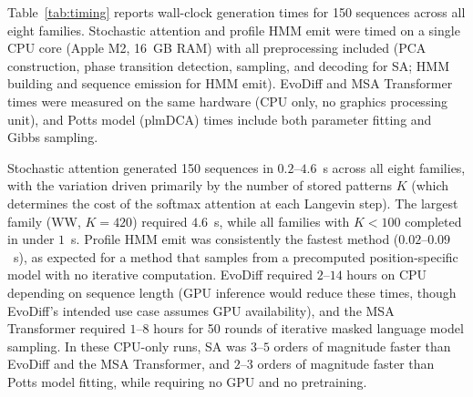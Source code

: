 Table~\ref{tab:timing} reports wall-clock generation times for 150 sequences across all eight families. Stochastic attention and profile HMM emit were timed on a single CPU core (Apple M2, 16~GB RAM) with all preprocessing included (PCA construction, phase transition detection, sampling, and decoding for SA; HMM building and sequence emission for HMM emit). EvoDiff and MSA Transformer times were measured on the same hardware (CPU only, no graphics processing unit), and Potts model (plmDCA) times include both parameter fitting and Gibbs sampling.

Stochastic attention generated 150 sequences in $0.2$--$4.6$~s across all eight families, with the variation driven primarily by the number of stored patterns $K$ (which determines the cost of the softmax attention at each Langevin step). The largest family (WW, $K{=}420$) required $4.6$~s, while all families with $K < 100$ completed in under $1$~s. Profile HMM emit was consistently the fastest method ($0.02$--$0.09$~s), as expected for a method that samples from a precomputed position-specific model with no iterative computation. EvoDiff required $2$--$14$ hours on CPU depending on sequence length (GPU inference would reduce these times, though EvoDiff's intended use case assumes GPU availability), and the MSA Transformer required $1$--$8$ hours for 50 rounds of iterative masked language model sampling. In these CPU-only runs, SA was $3$--$5$ orders of magnitude faster than EvoDiff and the MSA Transformer, and $2$--$3$ orders of magnitude faster than Potts model fitting, while requiring no GPU and no pretraining.

